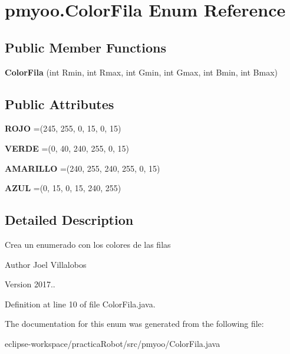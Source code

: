 \hypertarget{enumpmyoo_1_1_color_fila}{}\section{pmyoo.\+Color\+Fila Enum Reference}
\label{enumpmyoo_1_1_color_fila}
\subsection*{Public Member Functions}
\begin{DoxyCompactItemize}
\item 
\mbox{\label{enumpmyoo_1_1_color_fila_ac822879363bbdfb53a4fb44da03beefe}} 
{\bfseries Color\+Fila} (int Rmin, int Rmax, int Gmin, int Gmax, int Bmin, int Bmax)
\end{DoxyCompactItemize}
\subsection*{Public Attributes}
\begin{DoxyCompactItemize}
\item 
\mbox{\label{enumpmyoo_1_1_color_fila_a0f33dddb3e8daf8834050c5c50194504}} 
{\bfseries R\+O\+JO} =(245, 255, 0, 15, 0, 15)
\item 
\mbox{\label{enumpmyoo_1_1_color_fila_a8194291ebb273ed7eabafa10966af1ae}} 
{\bfseries V\+E\+R\+DE} =(0, 40, 240, 255, 0, 15)
\item 
\mbox{\label{enumpmyoo_1_1_color_fila_a84ddd5607ec71e2df78f191e2c21dbd1}} 
{\bfseries A\+M\+A\+R\+I\+L\+LO} =(240, 255, 240, 255, 0, 15)
\item 
\mbox{\label{enumpmyoo_1_1_color_fila_af06119bf777df785efd6342de105fa61}} 
{\bfseries A\+Z\+UL} =(0, 15, 0, 15, 240, 255)
\end{DoxyCompactItemize}


\subsection{Detailed Description}
Crea un enumerado con los colores de las filas \begin{DoxyAuthor}{Author}
Joel Villalobos 
\end{DoxyAuthor}
\begin{DoxyVersion}{Version}
2017.. 
\end{DoxyVersion}


Definition at line 10 of file Color\+Fila.\+java.



The documentation for this enum was generated from the following file\+:\begin{DoxyCompactItemize}
\item 
eclipse-\/workspace/practica\+Robot/src/pmyoo/Color\+Fila.\+java\end{DoxyCompactItemize}
